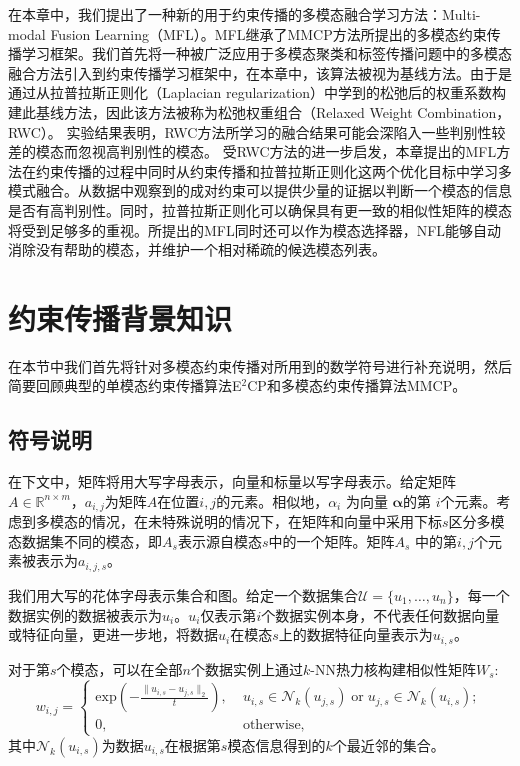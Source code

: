 在本章中，我们提出了一种新的用于约束传播的多模态融合学习方法：Multi-modal Fusion Learning（MFL）。MFL继承了MMCP方法所提出的多模态约束传播学习框架。我们首先将一种被广泛应用于多模态聚类和标签传播问题中的多模态融合方法引入到约束传播学习框架中，在本章中，该算法被视为基线方法。由于是通过从拉普拉斯正则化（Laplacian regularization）中学到的松弛后的权重系数构建此基线方法，因此该方法被称为松弛权重组合（Relaxed Weight Combination，RWC）。
实验结果表明，RWC方法所学习的融合结果可能会深陷入一些判别性较差的模态而忽视高判别性的模态。
受RWC方法的进一步启发，本章提出的MFL方法在约束传播的过程中同时从约束传播和拉普拉斯正则化这两个优化目标中学习多模式融合。从数据中观察到的成对约束可以提供少量的证据以判断一个模态的信息是否有高判别性。同时，拉普拉斯正则化可以确保具有更一致的相似性矩阵的模态将受到足够多的重视。所提出的MFL同时还可以作为模态选择器，NFL能够自动消除没有帮助的模态，并维护一个相对稀疏的候选模态列表。

\section{约束传播背景知识}
在本节中我们首先将针对多模态约束传播对所用到的数学符号进行补充说明，然后简要回顾典型的单模态约束传播算法E$^2$CP\cite{lu2010constrained}和多模态约束传播算法MMCP\cite{fu2011multi}。
\subsection{符号说明}
在下文中，矩阵将用大写字母表示，向量和标量以写字母表示。给定矩阵$ {A} \in \mathbb{R}^{n\times m}$，$ a_{i,j} $为矩阵$A$在位置$ i,j $的元素。相似地，$ \alpha_{i} $ 为向量 $ \boldsymbol{\alpha} $的第 $ i $个元素。考虑到多模态的情况，在未特殊说明的情况下，在矩阵和向量中采用下标$s$区分多模态数据集不同的模态，即${A}_s$表示源自模态$s$中的一个矩阵。矩阵$ {A}_s $ 中的第$ i,j $个元素被表示为$a_{i,j,s}$。

我们用大写的花体字母表示集合和图。给定一个数据集合$\mathcal{U} = \{u_1,\dots,u_n \}$，每一个数据实例的数据被表示为$u_i$。$u_i$仅表示第$i$个数据实例本身，不代表任何数据向量或特征向量，更进一步地，将数据$u_i$在模态$s$上的数据特征向量表示为$u_{i,s}$。

对于第$s$个模态，可以在全部$n$个数据实例上通过$k$-NN热力核构建相似性矩阵$ {W}_s$:
\begin{equation}
w_{i,j} = \begin{cases} \mathrm{exp}(-\frac{\|u_{i,s}-u_{j,s}\|_{2}}{t}), \; &u_{i,s}\in\mathcal{N}_k(u_{j,s})\;\mathrm{or}\; u_{j,s}\in\mathcal{N}_k(u_{i,s});\\
0,&\mathrm{otherwise,}\end{cases}   
\label{eq3:GaussKer}                              
\end{equation}
其中$\mathcal{N}_k(u_{i,s})$为数据$u_{i,s}$在根据第$s$模态信息得到的$k$个最近邻的集合。


